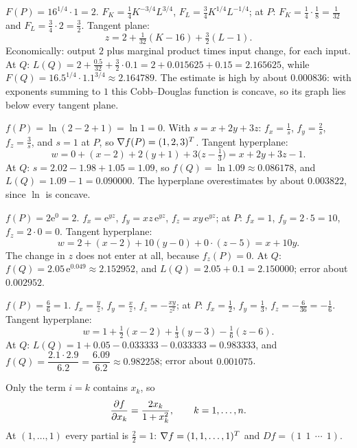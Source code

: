 \begin{solutions}
  \item $F(P)=16^{1/4}\cdot1=2$.
        $F_{K}=\tfrac14K^{-3/4}L^{3/4}$, $F_{L}=\tfrac34K^{1/4}L^{-1/4}$; at
        $P$: $F_{K}=\tfrac14\cdot\tfrac18=\tfrac1{32}$ and
        $F_{L}=\tfrac34\cdot2=\tfrac32$. Tangent plane:
        \[
          z=2+\tfrac1{32}(K-16)+\tfrac32(L-1) .
        \]
        Economically: output $2$ plus marginal product times input change,
        for each input. At $Q$: $L(Q)=2+\tfrac{0.5}{32}+\tfrac32\cdot0.1
        =2+0.015625+0.15=2.165625$, while
        $F(Q)=16.5^{1/4}\cdot1.1^{3/4}\approx2.164789$. The estimate is
        high by about $0.000836$: with exponents summing to $1$ this
        Cobb--Douglas function is concave, so its graph lies below every
        tangent plane.

  \item $f(P)=\ln(2-2+1)=\ln1=0$. With $s=x+2y+3z$:
        $f_{x}=\tfrac1s$, $f_{y}=\tfrac2s$, $f_{z}=\tfrac3s$, and $s=1$ at
        $P$, so $\nabla f(P)=(1,2,3)^{T}$. Tangent hyperplane:
        \[
          w=0+(x-2)+2(y+1)+3\bigl(z-\tfrac13\bigr)=x+2y+3z-1 .
        \]
        At $Q$: $s=2.02-1.98+1.05=1.09$, so $f(Q)=\ln1.09\approx0.086178$,
        and $L(Q)=1.09-1=0.090000$. The hyperplane overestimates by about
        $0.003822$, since $\ln$ is concave.

  \item $f(P)=2\mathrm{e}^{0}=2$. $f_{x}=\mathrm{e}^{yz}$,
        $f_{y}=xz\,\mathrm{e}^{yz}$, $f_{z}=xy\,\mathrm{e}^{yz}$; at $P$:
        $f_{x}=1$, $f_{y}=2\cdot5=10$, $f_{z}=2\cdot0=0$. Tangent
        hyperplane:
        \[
          w=2+(x-2)+10(y-0)+0\cdot(z-5)=x+10y .
        \]
        The change in $z$ does not enter at all, because $f_{z}(P)=0$. At
        $Q$: $f(Q)=2.05\,\mathrm{e}^{0.049}\approx2.152952$, and
        $L(Q)=2.05+0.1=2.150000$; error about $0.002952$.

  \item $f(P)=\tfrac66=1$. $f_{x}=\tfrac yz$, $f_{y}=\tfrac xz$,
        $f_{z}=-\tfrac{xy}{z^{2}}$; at $P$: $f_{x}=\tfrac12$,
        $f_{y}=\tfrac13$, $f_{z}=-\tfrac6{36}=-\tfrac16$. Tangent
        hyperplane:
        \[
          w=1+\tfrac12(x-2)+\tfrac13(y-3)-\tfrac16(z-6) .
        \]
        At $Q$: $L(Q)=1+0.05-0.033333-0.033333=0.983333$, and
        $f(Q)=\dfrac{2.1\cdot2.9}{6.2}=\dfrac{6.09}{6.2}\approx0.982258$;
        error about $0.001075$.

  \item Only the term $i=k$ contains $x_{k}$, so
        \[
          \frac{\partial f}{\partial x_{k}}=\frac{2x_{k}}{1+x_{k}^{2}},\qquad k=1,\ldots,n .
        \]
        At $(1,\ldots,1)$ every partial is $\tfrac22=1$:
        $\nabla f=(1,1,\ldots,1)^{T}$ and $Df=(1\ \ 1\ \ \cdots\ \ 1)$.


\end{solutions}
